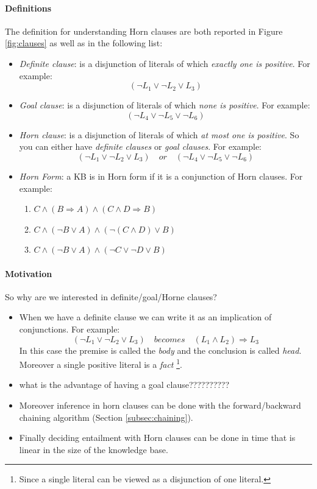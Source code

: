 \documentclass[10pt,a4paper]{article}
\begin{document}
\paragraph{Definitions}
The definition for understanding Horn clauses are both reported in Figure \ref{fig:clauses} as well as in the following list:
\begin{itemize}
\item \textit{Definite clause}: is a disjunction of literals of which \textit{exactly one is positive}. For example:\[(\neg L_1 \vee \neg L_2 \vee L_3)\]
\item \textit{Goal clause}: is a disjunction of literals of which \textit{none is positive}. For example:\[(\neg L_4 \vee \neg L_5 \vee \neg L_6)\]
\item \textit{Horn clause}: is a disjunction of literals of which \textit{at most one is positive}. So you can either have \textit{definite clauses} or \textit{goal clauses}. For example:\[(\neg L_1 \vee \neg L_2 \vee L_3)\quad or\quad (\neg L_4 \vee \neg L_5 \vee \neg L_6)\]
\item \textit{Horn Form}: a KB is in Horn form if it is a conjunction of Horn clauses. For example:

	\begin{enumerate}
	\item $C \wedge (B\Rightarrow A)\wedge(C\wedge D\Rightarrow B)$
	\item $C \wedge (\neg B \vee A)\wedge(\neg(C\wedge D)\vee B)$
	\item $C \wedge (\neg B \vee A)\wedge(\neg C\vee \neg D \vee B)$
	\end{enumerate}
	
\end{itemize}

\paragraph{Motivation}
So why are we interested in definite/goal/Horne clauses?\\
\begin{itemize}
\item When we have a definite clause we can write it as an implication of conjunctions. For example:
\[(\neg L_1 \vee \neg L_2 \vee L_3)\quad becomes\quad (L_1 \wedge L_2)\Rightarrow L_3\]
In this case the premise is called the \textit{body} and the conclusion is called \textit{head}. Moreover a single positive literal is a \textit{fact} \footnote{Since a single literal can be viewed as a disjunction of one literal.}.
\item what is the advantage of having a goal clause??????????
\item Moreover inference in horn clauses can be done with the forward/backward chaining algorithm (Section \ref{subsec:chaining}).
\item Finally deciding entailment with Horn clauses can be done in time that is linear in the size of the knowledge base.




\end{itemize}
\end{document}
